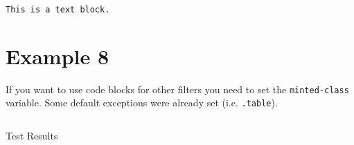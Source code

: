 \begin{verbatim}
This is a text block.
\end{verbatim}

\section{Example 8}\label{example-8}

If you want to use code blocks for other filters you need to set the
\texttt{minted-class} variable. Some default exceptions were
already set (i.e. \texttt{.table}).

\begin{listing}[H]
\begin{verbatim}

\end{verbatim}
\vspace{-5pt}
\caption{Test Results}
\end{listing}
